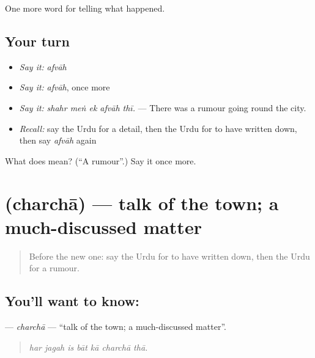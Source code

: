 \begin{grammarlens}[title={What you've built}]
One more word for telling what happened.
\end{grammarlens}

\subsection*{Your turn}
\begin{itemize}
\raggedright
  \item \emph{Say it:} \emph{afvāh}
  \item \emph{Say it:} \emph{afvāh}, once more
  \item \emph{Say it:} \emph{shahr meṅ ek afvāh thī.} — There was a rumour going round the city.
  \item \emph{Recall:} say the Urdu for a detail, then the Urdu for to have written down, then say \emph{afvāh} again
\end{itemize}

\begin{tcolorbox}[breakable,colback=teal!4,colframe=teal!35!black,title={Before you move on}]
What does  mean? (\textquotedblleft{}A rumour\textquotedblright{}.) Say it once more.
\end{tcolorbox}
\section[\texorpdfstring{\ur{چرچا} (charchā)}{چرچا (charchā)}]{ (charchā) — talk of the town; a much-discussed matter}

\label{lesson:UR-C302-charcha}



\begin{quote}
Before the new one: say the Urdu for to have written down, then the Urdu for a rumour.
\end{quote}

\subsection*{You'll want to know: }
\textbf{} — \emph{charchā} — \textquotedblleft{}talk of the town; a much-discussed matter\textquotedblright{}.

\begin{quote}
      
\end{quote}

\begin{quote}
\emph{har jagah is bāt kā charchā thā.}
\end{quote}

